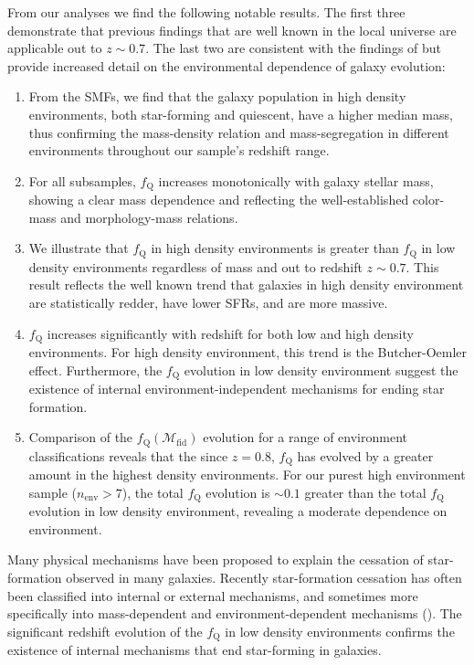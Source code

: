 \documentclass{aastex}
\begin{document}
From our analyses we find the following notable results. The first
three demonstrate that previous findings that are well known in the
local universe are applicable out to $z\sim 0.7$. The last two are
consistent with the findings of \cite{Peng:2010aa} but provide increased
detail on the environmental dependence of galaxy evolution:
\begin{enumerate}
	\item From the SMFs, we find that the galaxy population in high
    density environments, both star-forming and quiescent, have a
    higher median mass, thus confirming the mass-density relation and
    mass-segregation in different environments throughout our sample's
    redshift range.
	\item For all subsamples, $f_{\mathrm{Q}}$ increases monotonically with
    galaxy stellar mass, showing a clear mass dependence and
    reflecting the well-established color-mass and morphology-mass
    relations.
	\item We illustrate that $f_{\mathrm{Q}}$ in high density environments
    is greater than $f_{\mathrm{Q}}$ in low density environments
    regardless of mass and out to redshift $z\sim 0.7$. This result
    reflects the well known trend that galaxies in high density
    environment are statistically redder, have lower SFRs, and are
    more massive.
	\item $f_{\mathrm{Q}}$ increases significantly with redshift for both
    low and high density environments. For high density environment,
    this trend is the Butcher-Oemler effect. Furthermore, the
    $f_{\mathrm{Q}}$ evolution in low density environment suggest the
    existence of internal environment-independent mechanisms for
    ending star formation.
	\item Comparison of the $f_{\mathrm{Q}}(\mathcal{M}_{\mathrm{fid}})$
    evolution for a range of environment classifications reveals that
    the since $z = 0.8$, $f_{\mathrm{Q}}$ has evolved by a greater amount
    in the highest density environments. For our purest high
    environment sample ($n_{\mathrm{env}} > 7$), the total $f_{\mathrm{Q}}$
    evolution is $\sim 0.1$ greater than the total $f_{\mathrm{Q}}$
    evolution in low density environment, revealing a moderate
    dependence on environment.
\end{enumerate}

Many physical mechanisms have been proposed to explain the cessation
of star-formation observed in many galaxies. Recently star-formation
cessation has often been classified into internal or external
mechanisms, and sometimes more specifically into mass-dependent and
environment-dependent mechanisms (\citealt{Baldry:2006aa,
  Peng:2010aa}). The significant redshift evolution of the
$f_{\mathrm{Q}}$ in low density environments confirms the existence of
internal mechanisms that end star-forming in galaxies.
\end{document}
